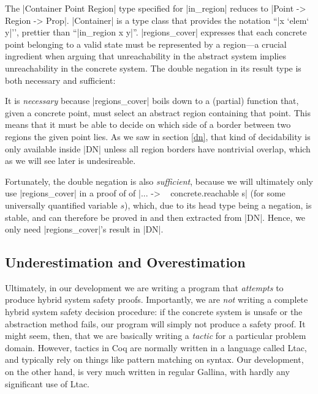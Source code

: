 \documentclass[runningheads]{llncs}
\begin{document}
The |Container Point Region| type specified for |in_region| reduces to
|Point -> Region -> Prop|. |Container| is a type class that provides
the notation ``|x `elem` y|'', prettier than ``|in_region x
y|''. |regions_cover| expresses that each concrete point belonging to
a valid state must be represented by a region---a crucial ingredient
when arguing that unreachability in the abstract system implies
unreachability in the concrete system. The double negation in its
result type is both necessary and sufficient:

It is \emph{necessary} because |regions_cover| boils down to a
(partial) function that, given a concrete point, must select an
abstract region containing that point. This means that it must be able
to decide on which side of a border between two regions the given
point lies. As we saw in section \ref{dn}, that kind of decidability
is only available inside |DN| unless all region borders have
nontrivial overlap, which as we will see later is undesireable.

Fortunately, the double negation is also \emph{sufficient}, because we
will ultimately only use |regions_cover| in a proof of of |... -> ~
concrete.reachable s| (for some universally quantified variable $s$),
which, due to its head type being a negation, is stable, and can
therefore be proved in and then extracted from |DN|. Hence, we only
need |regions_cover|'s result in |DN|.

\subsection{Underestimation and Overestimation}
\label{estimation}

Ultimately, in our development we are writing a program that
\emph{attempts} to produce hybrid system safety proofs. Importantly,
we are \emph{not} writing a complete hybrid system safety decision
procedure: if the concrete system is unsafe or the abstraction method
fails, our program will simply not produce a safety proof. It might
seem, then, that we are basically writing a \emph{tactic} for a
particular problem domain. However, tactics in Coq are normally
written in a language called Ltac, and typically rely on things like
pattern matching on syntax. Our development, on the other hand, is
very much written in regular Gallina, with hardly any significant use
of Ltac. 
\end{document}
